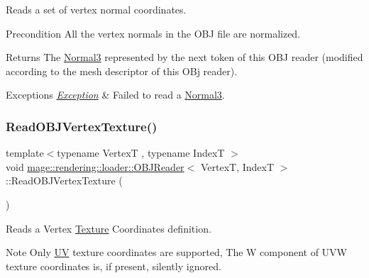 Reads a set of vertex normal coordinates.

\begin{DoxyPrecond}{Precondition}
All the vertex normals in the O\+BJ file are normalized. 
\end{DoxyPrecond}
\begin{DoxyReturn}{Returns}
The {\ttfamily \mbox{\hyperlink{structmage_1_1_normal3}{Normal3}}} represented by the next token of this O\+BJ reader (modified according to the mesh descriptor of this O\+Bj reader). 
\end{DoxyReturn}

\begin{DoxyExceptions}{Exceptions}
{\em \mbox{\hyperlink{classmage_1_1_exception}{Exception}}} & Failed to read a {\ttfamily \mbox{\hyperlink{structmage_1_1_normal3}{Normal3}}}. \\
\hline
\end{DoxyExceptions}
\mbox{\label{classmage_1_1rendering_1_1loader_1_1_o_b_j_reader_a91f53fd761c83c4135a3ef1882b8300d}} 
\subsubsection{\texorpdfstring{Read\+O\+B\+J\+Vertex\+Texture()}{ReadOBJVertexTexture()}}
{\footnotesize\ttfamily template$<$typename VertexT , typename IndexT $>$ \\
void \mbox{\hyperlink{classmage_1_1rendering_1_1loader_1_1_o_b_j_reader}{mage\+::rendering\+::loader\+::\+O\+B\+J\+Reader}}$<$ VertexT, IndexT $>$\+::Read\+O\+B\+J\+Vertex\+Texture (\begin{DoxyParamCaption}{ }\end{DoxyParamCaption})\hspace{0.3cm}{\ttfamily [private]}}

Reads a Vertex \mbox{\hyperlink{classmage_1_1rendering_1_1_texture}{Texture}} Coordinates definition.

\begin{DoxyNote}{Note}
Only \mbox{\hyperlink{structmage_1_1_u_v}{UV}} texture coordinates are supported, The W component of U\+VW texture coordinates is, if present, silently ignored. 
\end{DoxyNote}

